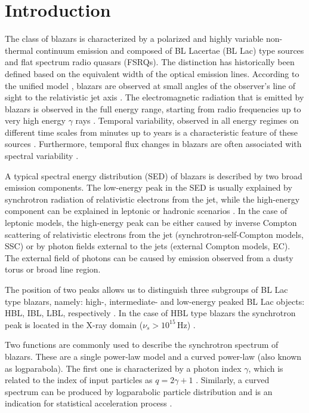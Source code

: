 \section{Introduction}\label{intro}
The class of blazars is characterized by a polarized and highly variable non-thermal continuum emission and composed of BL Lacertae (BL Lac) type sources and flat spectrum radio quasars (FSRQs).
The distinction has  historically been  defined based on the equivalent width of the optical emission lines.
According to the unified model \citep[e.g.][]{Urry95}, blazars are  observed at small angles of the observer's line of sight to the relativistic jet axis \citep[e.g.][]{begelman84}.
The electromagnetic radiation that is emitted by blazars is observed in the full energy range, starting from radio frequencies up to very high energy $\gamma$ rays \citep[e.g.][]{Wagner2009, Abramowski2014}.
Temporal variability, observed in all energy regimes on different time scales from minutes up to years is a characteristic feature of these sources \citep[e.g.][]{2155flare, Wierzcholska_0048, Liao15, Wierzcholskas5}.
Furthermore, temporal flux changes in blazars are often associated with spectral variability \citep[e.g.][]{Xue06, Bottcher10, Wierzcholska2016, Siejkowski_2017}.

A typical spectral energy distribution (SED) of blazars  is described by two broad emission components. 
The  low-energy peak in the SED is usually explained by synchrotron radiation of relativistic electrons from the jet, 
while the  high-energy component can be explained in leptonic or hadronic scenarios \citep[see, e.g.][]{Dermer92, Sikora94, Mucke13, Bottcher13}.
In the case of leptonic models, the high-energy peak can be either caused by inverse Compton scattering of relativistic electrons from the jet (synchrotron-self-Compton models, SSC) or by photon fields external to the jets (external Compton models, EC). 
The external field of photons can be caused by emission observed from  a dusty torus or broad line region. 

The position of two peaks allows us to distinguish three subgroups of BL Lac type blazars, namely: high-, intermediate- and low-energy  peaked BL Lac objects: HBL, IBL, LBL, respectively \citep[see, e.g.][]{padovani95, fossati98, Abdo2010}.
In the case of HBL type blazars the synchrotron peak is located in the X-ray domain ($\nu_{s}>10^{15}$\,Hz) \citep[][]{Abdo2010}.



  
Two functions are commonly used to describe the synchrotron spectrum of blazars. 
These are a single power-law model and a curved power-law (also known as logparabola). 
The first one is characterized by a photon index $\gamma$, which is related to the index of input particles as $q = 2\gamma +1$ \citep{Rybicki}.
Similarly, a curved spectrum can be produced by logparabolic particle distribution \citep{Paggi09} and is an indication for statistical acceleration process \citep[e.g.][]{Massaro2004, Massaro2006, Massaro2008, Tramacere2007}.



